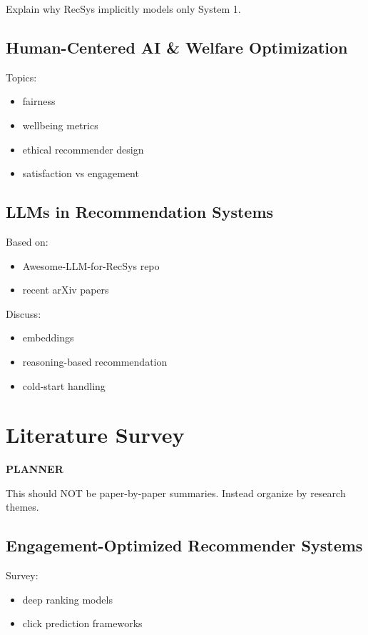 \documentclass[lettersize,journal]{IEEEtran}
\begin{document}
Explain why RecSys implicitly models only System 1.

\subsection{Human-Centered AI \& Welfare Optimization}

Topics:

\begin{itemize}
    \item fairness
    \item wellbeing metrics
    \item ethical recommender design
    \item satisfaction vs engagement
\end{itemize}

\subsection{LLMs in Recommendation Systems}

Based on:

\begin{itemize}
    \item Awesome-LLM-for-RecSys repo
    \item recent arXiv papers
\end{itemize}

Discuss:

\begin{itemize}
    \item embeddings
    \item reasoning-based recommendation
    \item cold-start handling
\end{itemize}

% 
\section{Literature Survey}

\textbf{PLANNER}

This should NOT be paper-by-paper summaries.
Instead organize by research themes.

\subsection{Engagement-Optimized Recommender Systems}

Survey:

\begin{itemize}
    \item deep ranking models
    \item click prediction frameworks
\end{itemize}   
\end{document}
